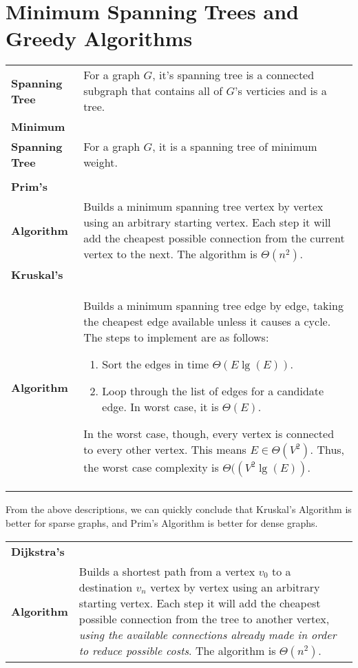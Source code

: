 \documentclass[aip, jmp, amsmath,amssymb, reprint]{revtex4-1}
\theoremstyle{definition}
\begin{document}
\section{Minimum Spanning Trees and Greedy Algorithms}
\begin{longtable}{p{2cm} p{6cm} }
    \textbf{Spanning Tree} & For a graph $G$, it's spanning tree is a connected subgraph that contains all of $G$'s verticies and is a tree.\\
    \textbf{Minimum}\\ \textbf{Spanning Tree} & For a graph $G$, it is a spanning tree of minimum weight.\\\\
    \textbf{Prim's}\\ \textbf{Algorithm} & Builds a minimum spanning tree vertex by vertex using an arbitrary starting vertex. Each step it will add the cheapest possible connection from the current vertex to the next. The algorithm is $\Theta(n^2)$.\\
    \textbf{Kruskal's}\\ \textbf{Algorithm} & \parbox[t]{6cm}{
    Builds a minimum spanning tree edge by edge, taking the cheapest edge available unless it causes a cycle. The steps to implement are as follows:
    \begin{enumerate}
        \item Sort the edges in time $\Theta(E \lg(E))$.
        \item Loop through the list of edges for a candidate edge. In worst case, it is $\Theta(E)$.
    \end{enumerate}
    In the worst case, though, every vertex is connected to every other vertex. This means $E \in \Theta(V^2)$. Thus, the worst case complexity is $\Theta((V^2 \lg(E))$.
    }
\end{longtable}
From the above descriptions, we can quickly conclude that Kruskal's Algorithm is better for sparse graphs, and Prim's Algorithm is better for dense graphs.
\begin{longtable}{p{2cm} p{6cm} }
    \textbf{Dijkstra's}\\ \textbf{Algorithm} & \parbox[t]{6cm}{
    Builds a shortest path from a vertex $v_0$ to a destination $v_n$ vertex by vertex using an arbitrary starting vertex. Each step it will add the cheapest possible connection from the tree to another vertex, \textit{using the available connections already made in order to reduce possible costs}. The algorithm is $\Theta(n^2)$.
    }
\end{longtable}
\end{document}

